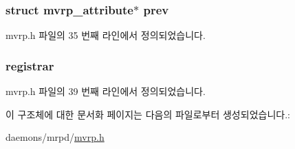 \subsubsection[{\texorpdfstring{prev}{prev}}]{\setlength{\rightskip}{0pt plus 5cm}struct {\bf mvrp\+\_\+attribute}$\ast$ prev}\hypertarget{structmvrp__attribute_afdae1b56171b26cdfd390a2b5120cf08}{}\label{structmvrp__attribute_afdae1b56171b26cdfd390a2b5120cf08}


mvrp.\+h 파일의 35 번째 라인에서 정의되었습니다.

\subsubsection[{\texorpdfstring{registrar}{registrar}}]{ registrar}\hypertarget{structmvrp__attribute_a9e893db6ef01e9cda330159f5d3ee764}{}\label{structmvrp__attribute_a9e893db6ef01e9cda330159f5d3ee764}


mvrp.\+h 파일의 39 번째 라인에서 정의되었습니다.



이 구조체에 대한 문서화 페이지는 다음의 파일로부터 생성되었습니다.\+:\begin{DoxyCompactItemize}
\item 
daemons/mrpd/\hyperlink{mvrp_8h}{mvrp.\+h}\end{DoxyCompactItemize}
